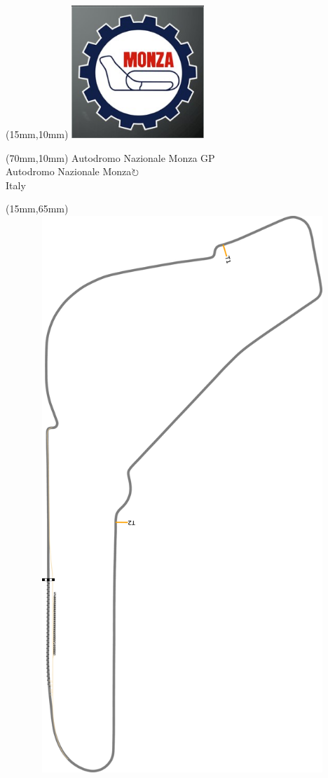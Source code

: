 \begin{textblock*}{50mm}(15mm,10mm)%
\includegraphics[width=50mm]{LG/2015-05-20_00086.png}
\end{textblock*}
\begin{textblock*}{130mm}(70mm,10mm)%
{\fontsize{20}{20}\selectfont Autodromo Nazionale Monza GP\\}
{\fontsize{16}{16}\selectfont Autodromo Nazionale Monza\hfill \Large$\circlearrowright$\\}
{\fontsize{12}{12}\selectfont Italy\\}
\end{textblock*}
\begin{textblock*}{185mm}(15mm,65mm)%
\centering
\mbox{\includegraphics[width=185mm,height=210mm,keepaspectratio]{PT/ANMOGP.pdf}}
\end{textblock*}

